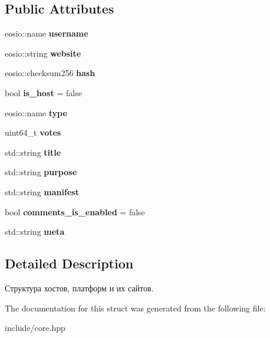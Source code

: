 \subsection*{Public Attributes}
\begin{DoxyCompactItemize}
\item 
\mbox{\label{structahosts_a3844566e5baa4b88d0f7eee778fbafbf}} 
eosio\+::name {\bfseries username}
\item 
\mbox{\label{structahosts_acc9472a06f1e644e3a89a9d53bd8d6d7}} 
eosio\+::string {\bfseries website}
\item 
\mbox{\label{structahosts_a0f6fcb2698373d5ea078e4c3bff4adaa}} 
eosio\+::checksum256 {\bfseries hash}
\item 
\mbox{\label{structahosts_a02600322cbae5f22e4406b657fad01d3}} 
bool {\bfseries is\+\_\+host} = false
\item 
\mbox{\label{structahosts_a434cfbd0c6623d238104ac340b9aaa5d}} 
eosio\+::name {\bfseries type}
\item 
\mbox{\label{structahosts_a0d761a9d91049405b10030079e850e09}} 
uint64\+\_\+t {\bfseries votes}
\item 
\mbox{\label{structahosts_a9c7a3e787eb79fdf2268b7ee12820f71}} 
std\+::string {\bfseries title}
\item 
\mbox{\label{structahosts_afc6c01b7d25e67f0b88e4326504c4a1f}} 
std\+::string {\bfseries purpose}
\item 
\mbox{\label{structahosts_a99aeb5eb867801efd8627f2026e29aa6}} 
std\+::string {\bfseries manifest}
\item 
\mbox{\label{structahosts_a4a026fb43ada2254c3ba097f7dd25302}} 
bool {\bfseries comments\+\_\+is\+\_\+enabled} = false
\item 
\mbox{\label{structahosts_a6f085948afc31b2d523e6136df73b3d2}} 
std\+::string {\bfseries meta}
\end{DoxyCompactItemize}


\subsection{Detailed Description}
Структура хостов, платформ и их сайтов. 

The documentation for this struct was generated from the following file\+:\begin{DoxyCompactItemize}
\item 
include/core.\+hpp\end{DoxyCompactItemize}

